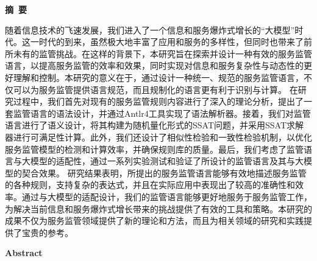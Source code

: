 \cleardoublepage{}
\begin{center}
    \bfseries {} 摘~要
\end{center}

随着信息技术的飞速发展，我们进入了一个信息和服务爆炸式增长的“大模型”时代。这一时代的到来，虽然极大地丰富了应用和服务的多样性，但同时也带来了前所未有的监管挑战。在这样的背景下，本研究旨在探索并设计一种有效的服务监管语言，以提高服务监管的效率和效果，同时实现对信息和服务复杂性与动态性的更好理解和控制。本研究的意义在于，通过设计一种统一、规范的服务监管语言，不仅可以为服务监管提供语言规范，而且规制化的语言更有利于识别与计算。
在研究过程中，我们首先对现有的服务监管规则内容进行了深入的理论分析，提出了一套监管语言的语法设计，并通过Antlr4工具实现了语法解析器。接着，我们对监管语言进行了语义设计，将其构建为随机量化形式的SSAT问题，并采用SSAT求解器进行可满足性计算。此外，我们还设计了相似性检验和一致性检验机制，以优化服务监管模型的检测和计算效率，并确保规则库的质量。最后，我们考虑了监管语言与大模型的适配性，通过一系列实验测试和验证了所设计的监管语言及其与大模型的契合效果。
研究结果表明，所提出的服务监管语言能够有效地描述服务监管的各种规则，支持复杂的表达式，并且在实际应用中表现出了较高的准确性和效率。通过与大模型的适配设计，我们的监管语言能够更好地服务于服务监管工作，为解决当前信息和服务爆炸式增长带来的挑战提供了有效的工具和策略。本研究的成果不仅为服务监管领域提供了新的理论和方法，而且为相关领域的研究和实践提供了宝贵的参考。

\cleardoublepage{}
\begin{center}
    \bfseries {} Abstract
\end{center}

